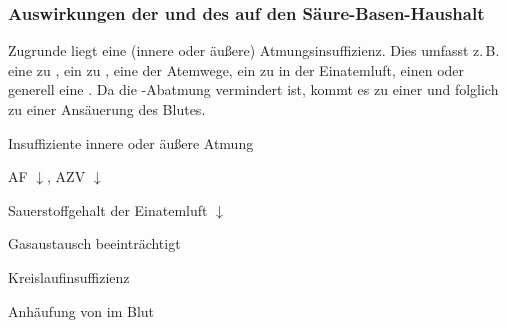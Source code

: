 \bigskip
\subsubsection{Auswirkungen der  und des 
auf den Säure-Basen-Haushalt}


 {%
\label{bkm:RefHeading35233321}%
\label{topic:azidose-respiratorische}%
%
%
Zugrunde liegt eine  (innere oder äußere)
Atmungsinsuffizienz.
Dies umfasst z.\,B.  eine zu ,
ein zu , eine  der
Atemwege, ein zu  in der
Einatemluft, einen  oder
generell eine .
Da die -Abatmung vermindert ist, kommt es zu einer
  und
folglich zu einer Ansäuerung des Blutes.

}
{\begin{compactitem}
  \item Insuffiziente innere oder äußere Atmung
  \begin{compactitem}
    \item AF $\downarrow$, AZV $\downarrow$
    \item Sauerstoffgehalt der Einatemluft $\downarrow$
    \item Gasaustausch beeinträchtigt
    \item Kreislaufinsuffizienz
  \end{compactitem}
  \item Anhäufung von
 im Blut
\end{compactitem}}
{}{}{}

% 







